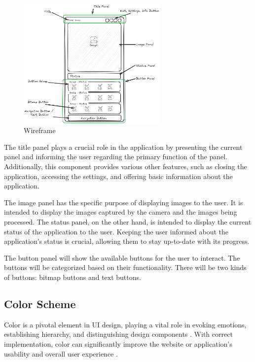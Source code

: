 \begin{figure}[!ht]
    \centering
    \includegraphics[width=0.65\textwidth]{texs/Part2/chapter3/image/wireframe.png}
    \caption{Wireframe}
    \label{fig:wireframe}
\end{figure}

The title panel plays a crucial role in the application by presenting the current panel and informing the user regarding the primary function of the panel. Additionally, this component provides various other features, such as closing the application, accessing the settings, and offering basic information about the application.

The image panel has the specific purpose of displaying images to the user. It is intended to display the images captured by the camera and the images being processed. The status panel, on the other hand, is intended to display the current status of the application to the user. Keeping the user informed about the application's status is crucial, allowing them to stay up-to-date with its progress.

The button panel will show the available buttons for the user to interact. The buttons will be categorized based on their functionality. There will be two kinds of buttons: bitmap buttons and text buttons.

\subsection{Color Scheme}

Color is a pivotal element in UI design, playing a vital role in evoking emotions, establishing hierarchy, and distinguishing design components \cite{M._2023}. With correct implementation, color can significantly improve the website or application's usability and overall user experience \cite{M._2023}.

